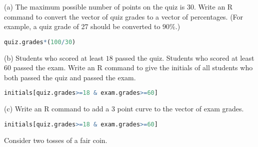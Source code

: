 \documentclass[boxes, qed]{homework}
\begin{document}
\begin{solution}
  (a) The maximum possible number of points on the quiz is $30$. Write an R command to convert
  the vector of quiz grades to a vector of percentages. 
  (For example, a quiz grade of 27 should be converted to $90\%$.)
  \begin{lstlisting}[backgroundcolor = \color{lightgray},language = R]
    quiz.grades*(100/30)
  \end{lstlisting}
  (b) Students who scored at least $18$ passed the quiz. 
  Students who scored at least $60$ passed the
  exam. Write an R command to give the initials of 
  all students who both passed the quiz and passed the
  exam.
  \begin{lstlisting}[backgroundcolor = \color{lightgray},language = R]
    initials[quiz.grades>=18 & exam.grades>=60]
  \end{lstlisting}
  (c) Write an R command to add a 3 point curve to the vector of exam grades.
  \begin{lstlisting}[backgroundcolor = \color{lightgray},language = R]
    initials[quiz.grades>=18 & exam.grades>=60]
  \end{lstlisting}
\end{solution}
\begin{problem}Consider two tosses of a fair coin.
\end{problem}
\end{document}
